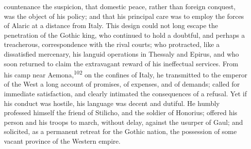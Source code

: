 countenance the suspicion, that domestic peace, rather than
foreign conquest, was the object of his policy; and that his
principal care was to employ the forces of Alaric at a distance
from Italy. This design could not long escape the penetration of
the Gothic king, who continued to hold a doubtful, and perhaps a
treacherous, correspondence with the rival courts; who
protracted, like a dissatisfied mercenary, his languid operations
in Thessaly and Epirus, and who soon returned to claim the
extravagant reward of his ineffectual services. From his camp
near Aemona,\textsuperscript{102} on the confines of Italy, he transmitted to the
emperor of the West a long account of promises, of expenses, and
of demands; called for immediate satisfaction, and clearly
intimated the consequences of a refusal. Yet if his conduct was
hostile, his language was decent and dutiful. He humbly professed
himself the friend of Stilicho, and the soldier of Honorius;
offered his person and his troops to march, without delay,
against the usurper of Gaul; and solicited, as a permanent
retreat for the Gothic nation, the possession of some vacant
province of the Western empire.




